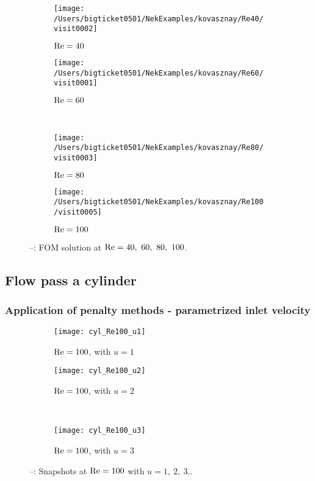 \begin{figure}[!h]
     \centering
     \begin{subfigure}[b]{0.45\textwidth}
         \centering
         \texttt{[image: /Users/bigticket0501/NekExamples/kovasznay/Re40/visit0002]}
         \caption{$\rm Re=40$}
         \label{fig:4_a}
     \end{subfigure}
     \hfill
     \begin{subfigure}[b]{0.45\textwidth}
         \centering
         \texttt{[image: /Users/bigticket0501/NekExamples/kovasznay/Re60/visit0001]}
         \caption{$\rm Re=60$}
         \label{fig:4_b}
     \end{subfigure}\\
     \begin{subfigure}[b]{0.45\textwidth}
         \centering
         \texttt{[image: /Users/bigticket0501/NekExamples/kovasznay/Re80/visit0003]}
         \caption{$\rm Re=80$}
         \label{fig:4_c}
     \end{subfigure}
     \hfill
     \begin{subfigure}[b]{0.45\textwidth}
         \centering
         \texttt{[image: /Users/bigticket0501/NekExamples/kovasznay/Re100/visit0005]}
         \caption{$\rm Re=100$}
         \label{fig:4_d}
     \end{subfigure}
     \caption{--: FOM solution at $\rm
     Re=40,~60,~80,~100$.} \label{fig:4}
\end{figure}

\newpage
\subsection{Flow pass a cylinder}
\subsubsection{Application of penalty methods - parametrized inlet velocity}
\begin{figure}[!h]
     \centering
     \begin{subfigure}[b]{0.45\textwidth}
         \centering
         \texttt{[image: cyl\_Re100\_u1]}
         \caption{$\rm Re=100$, with $u=1$}
         \label{fig:5_a}
     \end{subfigure}
     \hfill
     \begin{subfigure}[b]{0.45\textwidth}
         \centering
         \texttt{[image: cyl\_Re100\_u2]}
         \caption{$\rm Re=100$, with $u=2$}
         \label{fig:5_b}
     \end{subfigure}\\
     \begin{subfigure}[b]{0.45\textwidth}
         \centering
         \texttt{[image: cyl\_Re100\_u3]}
         \caption{$\rm Re=100$, with $u=3$}
         \label{fig:5_c}
     \end{subfigure}
     \caption{--: Snapshots at $\rm
     Re=100$ with $u=1,~2,~3$..} \label{fig:5}
\end{figure}

